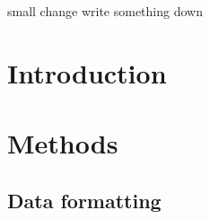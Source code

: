 \documentclass{article}
\begin{document}
small change
write something down

\section{Introduction}
\section{Methods}
\subsection{Data formatting}
\end{document}
